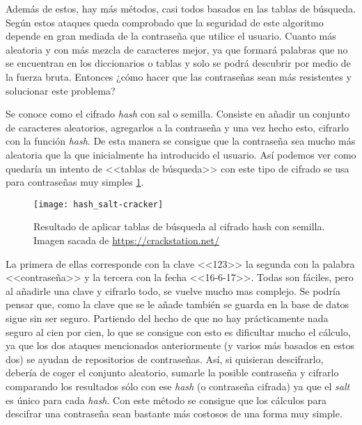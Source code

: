 Además de estos, hay más métodos, casi todos basados en las tablas de búsqueda. Según estos ataques queda comprobado que la seguridad de este algoritmo depende en gran mediada de la contraseña que utilice el usuario. Cuanto más aleatoria y con más mezcla de caracteres mejor, ya que formará palabras que no se encuentran en los diccionarios o tablas y solo se podrá descubrir por medio de la fuerza bruta. Entonces ¿cómo hacer que las contraseñas sean más resistentes y solucionar este problema?

Se conoce como el cifrado \emph{hash} con sal o semilla. Consiste en añadir un conjunto de caracteres aleatorios, agregarlos a la contraseña y una vez hecho esto, cifrarlo con la función \emph{hash}. De esta manera se consigue que la contraseña sea mucho más aleatoria que la que inicialmente ha introducido el usuario. Así podemos ver como quedaría un intento de <<tablas de búsqueda>> con este tipo de cifrado se usa para contraseñas muy simples \ref{fig:3.3}. 

\begin{figure}[h]
\centering
\texttt{[image: hash\_salt-cracker]}
\caption[Resultado de aplicar tablas de búsqueda al cifrado hash con semilla.]{Resultado de aplicar tablas de búsqueda al cifrado hash con semilla. Imagen sacada de \url{https://crackstation.net/}}
\label{fig:3.3}
\end{figure}

La primera de ellas corresponde con la clave <<123>> la segunda con la palabra <<contraseña>> y la tercera con la fecha <<16-6-17>>. Todas son fáciles, pero al añadirle una clave y cifrarlo todo, se vuelve mucho mas complejo. Se podría pensar que, como la clave que se le añade también se guarda en la base de datos sigue sin ser seguro. Partiendo del hecho de que no hay prácticamente nada seguro al cien por cien, lo que se consigue con esto es dificultar mucho el cálculo, ya que los dos ataques mencionados anteriormente (y varios más basados en estos dos) se ayudan de repositorios de contraseñas. Así, si quisieran descifrarlo, debería de coger el conjunto aleatorio, sumarle la posible contraseña y cifrarlo comparando los resultados sólo con ese \emph{hash} (o contraseña cifrada) ya que el \emph{salt} es único para cada \emph{hash}. Con este método se consigue que los cálculos para descifrar una contraseña sean bastante más costosos de una forma muy simple.
